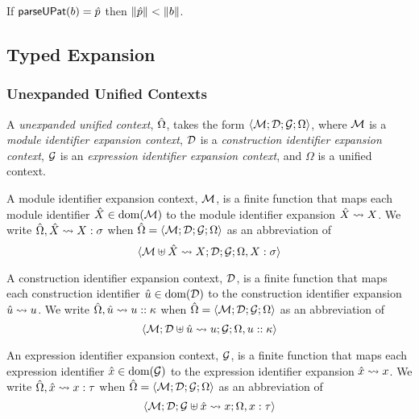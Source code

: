 \begin{condition}\label{condition:pattern-parsing-P} If $\mathsf{parseUPat}(b)=\hat{p}$ then $\Vert \hat{p} \Vert < \Vert b \Vert$.\end{condition}

\subsection{Typed Expansion}\label{appendix:typed-expansion-P}
\subsubsection{Unexpanded Unified Contexts}\label{appendix:u-unified-ctxs}
A \emph{unexpanded unified context}, ${\hat\Omega}$, takes the form $\langle \mathcal{M}; \mathcal{D}; \mathcal{G}; \Omega \rangle$, where $\mathcal{M}$ is a \emph{module identifier expansion context}, $\mathcal{D}$ is a \emph{construction identifier expansion context}, $\mathcal{G}$ is an \emph{expression identifier expansion context}, and $\Omega$ is a unified context.

A module identifier expansion context, $\mathcal{M}$, is a finite function that maps each module identifier ${\hat X} \in \text{dom}(\mathcal{M})$ to the module identifier expansion ${\hat X} \leadsto X$. We write ${\hat\Omega}, {\hat X} \leadsto X : \sigma$ when ${\hat\Omega}=\langle \mathcal{M}; \mathcal{D}; \mathcal{G}; \Omega \rangle$ as an abbreviation of \[\langle \mathcal{M} \uplus {\hat X} \leadsto X; \mathcal{D}; \mathcal{G}; \Omega, X : \sigma \rangle\]

A construction identifier expansion context, $\mathcal{D}$, is a finite function that maps each construction identifier ${\hat u} \in \text{dom}(\mathcal{D})$ to the construction identifier expansion ${\hat u} \leadsto u$. We write ${\hat\Omega}, {\hat u} \leadsto u :: \kappa$ when ${\hat\Omega}=\langle \mathcal{M}; \mathcal{D}; \mathcal{G}; \Omega \rangle$ as an abbreviation of \[\langle \mathcal{M}; \mathcal{D} \uplus {\hat u} \leadsto u; \mathcal{G}; \Omega, u :: \kappa \rangle\]

An expression identifier expansion context, $\mathcal{G}$, is a finite function that maps each expression identifier ${\hat x} \in \text{dom}(\mathcal{G})$ to the expression identifier expansion ${\hat x} \leadsto x$. We write ${\hat\Omega}, {\hat x} \leadsto x : \tau$ when ${\hat\Omega}=\langle \mathcal{M}; \mathcal{D}; \mathcal{G}; \Omega \rangle$ as an abbreviation of \[\langle \mathcal{M}; \mathcal{D}; \mathcal{G} \uplus {\hat x} \leadsto x; \Omega, x : \tau \rangle\]


